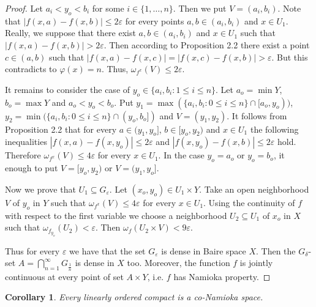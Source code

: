 \documentclass{amsart}
\newtheorem{corollary}[theorem]{Corollary}
\begin{document}
\begin{proof}
Let $a_i<y_o<b_i$ for some $i\in \{1,\dots,n\}$. Then we put $V=(a_i,b_i)$. Note that $|f(x,a)-f(x,b)|\leq 2\varepsilon$ for every points $a,b \in (a_i,b_i)$ and $x\in U_1$. Really, we suppose that there exist $a,b \in (a_i,b_i)$ and $x\in U_1$ such that  $|f(x,a)-f(x,b)|> 2\varepsilon$. Then according to Proposition 2.2 there exist a point $c\in (a,b)$ such that $|f(x,a)-f(x,c)|=|f(x,c)-f(x,b)|>\varepsilon$. But this contradicts to $\varphi(x)=n$. Thus, $\omega_{f^x}(V)\leq 2\varepsilon$.

It remains to consider the case of $y_o\in \{a_i,b_i:1\leq i \leq n\}$. Let $a_o=\min Y$, $b_o=\max Y$ and $a_o<y_o<b_o$. Put $y_1=\max(\{a_i,b_i:0\leq i\leq n\}\cap [a_o, y_o))$, $y_2=\min(\{a_i,b_i:0\leq i\leq n\}\cap(y_o,b_o])$ and $V=(y_1,y_2)$. It follows from Proposition 2.2 that for every $a\in(y_1,y_o]$, $b\in[y_o,y_2)$ and $x\in U_1$ the following inequalities $|f(x,a)-f(x,y_o)|\leq 2\varepsilon$ and $|f(x,y_o)-f(x,b)|\leq 2\varepsilon$ hold. Therefore $\omega_{f^x}(V)\leq 4\varepsilon$ for every $x\in U_1$. In the case $y_o=a_o$ or $y_o=b_o$, it enough to put $V=[y_o,y_2)$ or $V=(y_1,y_o]$.

Now we prove that $U_1\subseteq G_{\varepsilon}$. Let $(x_o,y_o)\in U_1\times Y$. Take an open neighborhood $V$ of $y_o$ in $Y$ such that $\omega_{f^x}(V)\leq 4\varepsilon$ for every $x\in U_1$. Using the continuity of $f$ with respect to the first variable we choose a neighborhood $U_2\subseteq U_1$ of $x_o$ in $X$
such that $\omega_{f_{y_o}}(U_2)<\varepsilon$. Then $\omega_f(U_2\times V)<9\varepsilon$.

Thus for every $\varepsilon$ we have that the set $G_{\varepsilon}$ is dense in Baire space $X$. Then the $G_{\delta}$-set $A=\bigcap\limits^{\infty}_{n=1} G_{\frac{1}{n}}$ is dense in $X$ too. Moreover, the function $f$ is jointly continuous at every point of set $A\times Y$, i.e. $f$ has Namioka property.
\end{proof}

\begin{corollary} \label{c:3.2} Every linearly ordered compact is a co-Namioka space.\end{corollary}
\end{document}
